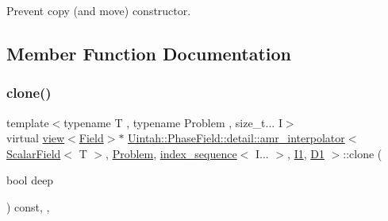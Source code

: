 Prevent copy (and move) constructor. 



\subsection{Member Function Documentation}
\mbox{\label{classUintah_1_1PhaseField_1_1detail_1_1amr__interpolator_3_01ScalarField_3_01T_01_4_00_01Problem71844444bc14a03c0566689b6b502040_ad67d51ec30f811cb8e8ac5c6a87c97e1}} 
\subsubsection{\texorpdfstring{clone()}{clone()}\hspace{0.1cm}{\footnotesize\ttfamily [1/2]}}
{\footnotesize\ttfamily template$<$typename T , typename Problem , size\+\_\+t... I$>$ \\
virtual \hyperlink{classUintah_1_1PhaseField_1_1detail_1_1view}{view}$<$\hyperlink{structUintah_1_1PhaseField_1_1ScalarField}{Field}$>$$\ast$ \hyperlink{classUintah_1_1PhaseField_1_1detail_1_1amr__interpolator}{Uintah\+::\+Phase\+Field\+::detail\+::amr\+\_\+interpolator}$<$ \hyperlink{structUintah_1_1PhaseField_1_1ScalarField}{Scalar\+Field}$<$ T $>$, \hyperlink{classUintah_1_1PhaseField_1_1Problem}{Problem}, \hyperlink{namespaceUintah_1_1PhaseField_a237de804d99512e50613aff7c94a9461}{index\+\_\+sequence}$<$ I... $>$, \hyperlink{namespaceUintah_1_1PhaseField_a547ce3002aa97fbd3ef3192a6eec8406a66f19efe774b0d2b6e5844eb2d83d305}{I1}, \hyperlink{namespaceUintah_1_1PhaseField_a12bfc68444894dffdf0cb8d9cf0cc76aa24dcc0ba6bcb45bc6f503b1b538c6809}{D1} $>$\+::clone (\begin{DoxyParamCaption}\item[{bool}]{deep }\end{DoxyParamCaption}) const\hspace{0.3cm}{\ttfamily [inline]}, {\ttfamily [override]}, {\ttfamily [virtual]}}



